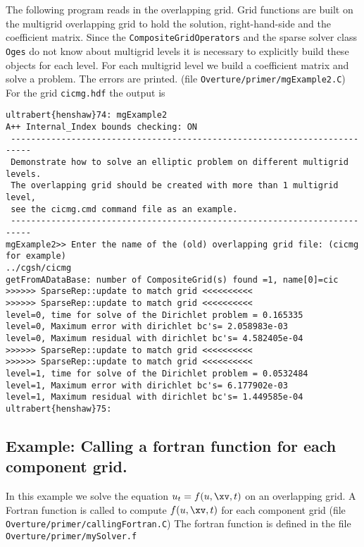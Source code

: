 \documentclass{article}
\begin{document}
The following program reads in the overlapping grid. 
Grid functions are built on the multigrid overlapping grid to hold the solution, right-hand-side
and the coefficient matrix. Since the {\tt CompositeGridOperators} and the sparse solver
class {\tt Oges} do not know about multigrid levels it is necessary to explicitly build these objects
for each level. For each multigrid level we build a coefficient matrix and solve a problem.
The errors are printed.
(file {\tt Overture/primer/mgExample2.C})
{\footnotesize
{}
}
For the grid {\tt cicmg.hdf} the output is
{\footnotesize
\begin{verbatim}
ultrabert{henshaw}74: mgExample2
A++ Internal_Index bounds checking: ON 
 -------------------------------------------------------------------------- 
 Demonstrate how to solve an elliptic problem on different multigrid levels.
 The overlapping grid should be created with more than 1 multigrid level,   
 see the cicmg.cmd command file as an example.                              
 -------------------------------------------------------------------------- 
mgExample2>> Enter the name of the (old) overlapping grid file: (cicmg for example)
../cgsh/cicmg
getFromADataBase: number of CompositeGrid(s) found =1, name[0]=cic
>>>>>> SparseRep::update to match grid <<<<<<<<<< 
>>>>>> SparseRep::update to match grid <<<<<<<<<< 
level=0, time for solve of the Dirichlet problem = 0.165335
level=0, Maximum error with dirichlet bc's= 2.058983e-03
level=0, Maximum residual with dirichlet bc's= 4.582405e-04
>>>>>> SparseRep::update to match grid <<<<<<<<<< 
>>>>>> SparseRep::update to match grid <<<<<<<<<< 
level=1, time for solve of the Dirichlet problem = 0.0532484
level=1, Maximum error with dirichlet bc's= 6.177902e-03
level=1, Maximum residual with dirichlet bc's= 1.449585e-04
ultrabert{henshaw}75: 
\end{verbatim}
}

\clearpage
\subsection{Example: Calling a fortran function for each component grid.}

In this example we solve the equation $u_t=f(u,\xv,t)$ on an overlapping grid.
A Fortran function is called to compute $f(u,\xv,t)$ for each component grid
(file {\tt Overture/primer/callingFortran.C})
{\footnotesize
{}
}
The fortran function is defined in the file {\tt Overture/primer/mySolver.f}
\end{document}

